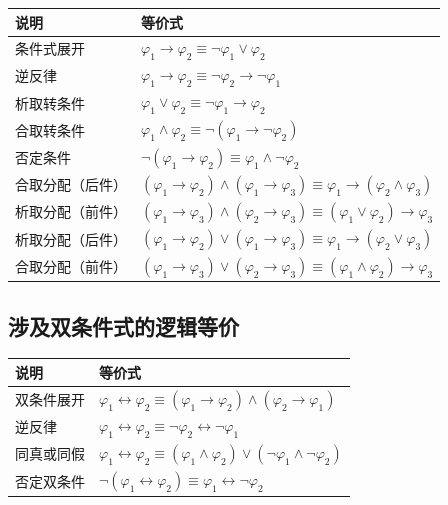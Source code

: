 \documentclass[UTF8,11pt,a4paper]{ctexbook}   %
\theoremstyle{definition}
\begin{document}
\begin{table}[htbp]
\centering
\begin{tabular}{|l|l|}
\hline
\textbf{说明} & \textbf{等价式} \\
\hline
条件式展开 & $\varphi_1 \to \varphi_2 \equiv \neg\varphi_1 \lor \varphi_2$ \\
逆反律 & $\varphi_1 \to \varphi_2 \equiv \neg\varphi_2 \to \neg\varphi_1$ \\
析取转条件 & $\varphi_1 \lor \varphi_2 \equiv \neg\varphi_1 \to \varphi_2$ \\
合取转条件 & $\varphi_1 \land \varphi_2 \equiv \neg(\varphi_1 \to \neg\varphi_2)$ \\
否定条件 & $\neg(\varphi_1 \to \varphi_2) \equiv \varphi_1 \land \neg\varphi_2$ \\
合取分配（后件）& $(\varphi_1 \to \varphi_2) \land (\varphi_1 \to \varphi_3) \equiv \varphi_1 \to (\varphi_2 \land \varphi_3)$ \\
析取分配（前件） & $(\varphi_1 \to \varphi_3) \land (\varphi_2 \to \varphi_3) \equiv (\varphi_1 \lor \varphi_2) \to \varphi_3$ \\
析取分配（后件） & $(\varphi_1 \to \varphi_2) \lor (\varphi_1 \to \varphi_3) \equiv \varphi_1 \to (\varphi_2 \lor \varphi_3)$ \\
合取分配（前件） & $(\varphi_1 \to \varphi_3) \lor (\varphi_2 \to \varphi_3) \equiv (\varphi_1 \land \varphi_2) \to \varphi_3$ \\
\hline
\end{tabular}
\end{table}

\subsection{\texorpdfstring{涉及双条件式的逻辑等价}{涉及双条件式的逻辑等价}}

\begin{table}[htbp]
\centering
\begin{tabular}{|l|l|}
\hline
\textbf{说明} & \textbf{等价式} \\
\hline
双条件展开 & $\varphi_1 \leftrightarrow \varphi_2 \equiv (\varphi_1 \to \varphi_2) \land (\varphi_2 \to \varphi_1)$ \\
逆反律 & $\varphi_1 \leftrightarrow \varphi_2 \equiv \neg\varphi_2 \leftrightarrow \neg\varphi_1$ \\
同真或同假 & $\varphi_1 \leftrightarrow \varphi_2 \equiv (\varphi_1 \land \varphi_2) \lor (\neg\varphi_1 \land \neg\varphi_2)$ \\
否定双条件 & $\neg(\varphi_1 \leftrightarrow \varphi_2) \equiv \varphi_1 \leftrightarrow \neg\varphi_2$ \\
\hline
\end{tabular}
\end{table}
\end{document}
